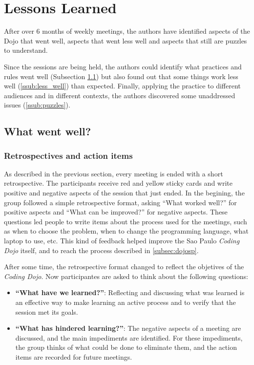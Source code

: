 \section{Lessons Learned}\label{sec:lessons_learned}

After over 6 months of weekly meetings, the authors have identified
aspects of the Dojo that went well, aspects that went less well and
aspects that still are puzzles to understand.

Since the sessions are being held, the authors could identify what
practices and rules went well (Subsection \ref{ssub:well}) but also
found out that some things work less well (\ref{ssub:less_well}) than
expected. Finally, applying the practice to different audiences and in
different contexts, the authors discovered some unaddressed issues
(\ref{ssub:puzzles}).

\subsection{What went well?}\label{ssub:well}

\subsubsection{Retrospectives and action items}

As described in the previous section, every meeting is ended with a
short retrospective. The participants receive red and yellow sticky
cards and write positive and negative aspects of the session that just
ended. In the begining, the group followed a simple retrospective
format, asking ``What worked well?'' for positive aspects and ``What
can be improved?'' for negative aspects. These questions led people to
write items about the process used for the meetings, such as when to
choose the problem, when to change the programming language, what
laptop to use, etc. This kind of feedback helped improve the Sao Paulo
\emph{Coding Dojo} itself, and to reach the process described in
\ref{subsec:dojosp}.

After some time, the retrospective format changed to reflect the
objetives of the \emph{Coding Dojo}. Now participantes are asked to
think about the following questions:

\begin{itemize}
\item \textbf{``What have we learned?''}: Reflecting and discussing
  what was learned is an effective way to make learning an active
  process and to verify that the session met its goals.
\item \textbf{``What has hindered learning?''}: The negative aspects
  of a meeting are discussed, and the main impediments are
  identified. For these impediments, the group thinks of what could be
  done to eliminate them, and the action items are recorded for future
  meetings.
\end{itemize}

